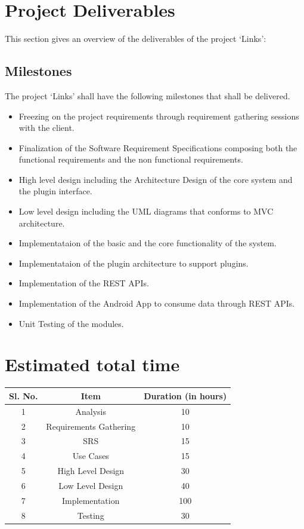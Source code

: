 \documentclass[11pt]{report} %
\begin{document}
\section*{Project Deliverables}
This section gives an overview of the deliverables of the project `Links':
\subsection*{Milestones}
The project `Links' shall have the following milestones that shall be delivered.
\begin{itemize}
\item
Freezing on the project requirements through requirement gathering sessions with the client.
\item
Finalization of the Software Requirement Specifications composing both the functional requirements and the non functional requirements.
\item
High level design including the Architecture Design of the core system and the plugin interface.
\item
Low level design including the UML diagrams that conforms to MVC architecture.
\item
Implementataion of the basic and the core functionality of the system.
\item
Implementataion of the plugin architecture to support plugins.
\item
Implementation of the REST APIs.
\item
Implementation of the Android App to consume data through REST APIs.
\item
Unit Testing of the modules.
\end{itemize}

\section*{Estimated total time}
\begin{tabular}{ | c | c | c | }
\hline            
  Sl. No. & Item & Duration (in hours) \\
\hline  
\hline  
  1 & Analysis & 10 \\
\hline  
\hline  
  2 & Requirements Gathering & 10 \\
\hline  
\hline  
  3 & SRS & 15 \\
\hline  
\hline  
  4 & Use Cases & 15 \\
\hline  
\hline  
  5 & High Level Design & 30 \\
\hline  
\hline  
  6 & Low Level Design & 40 \\
\hline  
\hline  
  7 & Implementation & 100 \\
\hline  
\hline  
  8 & Testing & 30 \\
\hline  
\end{tabular}
\end{document}
